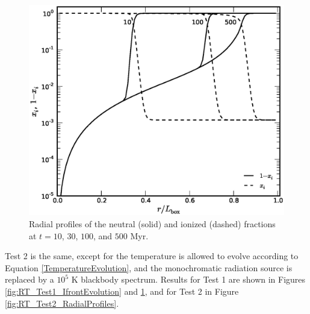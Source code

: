\documentclass[preprint2]{aastex}              %
\begin{document}
\begin{figure}[htbp]
\begin{center}
\includegraphics[scale=0.4]{figures/RT_Test1_RadialProfiles.ps} 
\vspace{-20pt}
\caption[]{Radial profiles of the neutral (solid) and ionized (dashed) fractions at $t = 10$, $30$, $100$, and $500$ Myr.}
\label{fig:RT_Test1_RadialProfiles}
\end{center}
\end{figure}

Test 2 is the same, except for the temperature is allowed to evolve according to Equation \ref{TemperatureEvolution}, and the monochromatic radiation source is replaced by a $10^5$ K blackbody spectrum.  Results for Test 1 are shown in Figures \ref{fig:RT_Test1_IfrontEvolution} and \ref{fig:RT_Test1_RadialProfiles}, and for Test 2 in Figure \ref{fig:RT_Test2_RadialProfiles}.
\end{document}
